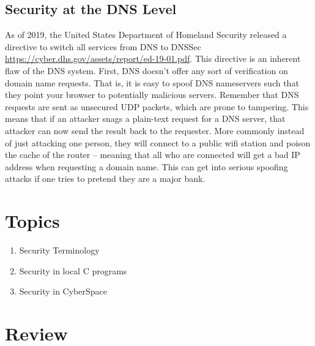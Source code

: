 \subsection{Security at the DNS Level}

As of 2019, the United States Department of Homeland Security released a directive to switch all services from DNS to DNSSec \url{https://cyber.dhs.gov/assets/report/ed-19-01.pdf}.
This directive is an inherent flaw of the DNS system.
First, DNS doesn't offer any sort of verification on domain name requests.
That is, it is easy to spoof DNS nameservers such that they point your browser to potentially malicious servers.
Remember that DNS requests are sent as unsecured UDP packets, which are prone to tampering. This means that if an attacker snags a plain-text request for a DNS server, that attacker can now send the result back to the requester.
More commonly instead of just attacking one person, they will connect to a public wifi station and poison the cache of the router -- meaning that all who are connected will get a bad IP address when requesting a domain name.
This can get into serious spoofing attacks if one tries to pretend they are a major bank.

\section{Topics}

\begin{enumerate}
\item Security Terminology
\item Security in local C programs
\item Security in CyberSpace
\end{enumerate}

\section{Review}

